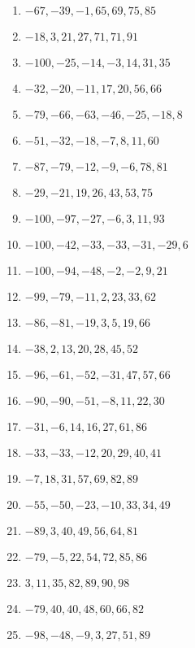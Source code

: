\documentclass{article}
\begin{document}
\fontsize{12pt}{0}
\begin{multicols*}{2}
\begin{enumerate}

    \item $-67, -39, -1, 65, 69, 75, 85$
    \item $-18, 3, 21, 27, 71, 71, 91$
    \item $-100, -25, -14, -3, 14, 31, 35$
    \item $-32, -20, -11, 17, 20, 56, 66$
    \item $-79, -66, -63, -46, -25, -18, 8$
    \item $-51, -32, -18, -7, 8, 11, 60$
    \item $-87, -79, -12, -9, -6, 78, 81$
    \item $-29, -21, 19, 26, 43, 53, 75$
    \item $-100, -97, -27, -6, 3, 11, 93$
    \item $-100, -42, -33, -33, -31, -29, 6$
    \item $-100, -94, -48, -2, -2, 9, 21$
    \item $-99, -79, -11, 2, 23, 33, 62$
    \item $-86, -81, -19, 3, 5, 19, 66$
    \item $-38, 2, 13, 20, 28, 45, 52$
    \item $-96, -61, -52, -31, 47, 57, 66$
    \item $-90, -90, -51, -8, 11, 22, 30$
    \item $-31, -6, 14, 16, 27, 61, 86$
    \item $-33, -33, -12, 20, 29, 40, 41$
    \item $-7, 18, 31, 57, 69, 82, 89$
    \item $-55, -50, -23, -10, 33, 34, 49$
    \item $-89, 3, 40, 49, 56, 64, 81$
    \item $-79, -5, 22, 54, 72, 85, 86$
    \item $3, 11, 35, 82, 89, 90, 98$
    \item $-79, 40, 40, 48, 60, 66, 82$
    \item $-98, -48, -9, 3, 27, 51, 89$    

\end{enumerate}
\end{multicols*}
\end{document}
